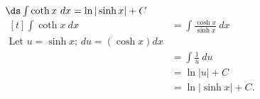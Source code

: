{$\ds \int \coth x\ dx  = \ln |\sinh x| + C$}
{\hfill$\begin{aligned}[t]
		\int \coth x\ dx &= \int \frac{\cosh x}{\sinh x}\ dx\\
											\text{Let $u = \sinh x$; $du = (\cosh x) dx$} 	\\
											&= \int \frac{1}{u}\ du \\
											&= \ln |u| + C \\
											&= \ln |\sinh x| + C.
\end{aligned}$\hfill\null}
